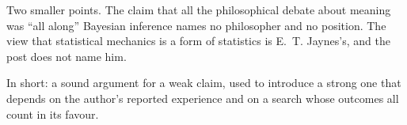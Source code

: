 \begin{afterword}
Two smaller points. The claim that all the philosophical debate about meaning was ``all along'' Bayesian inference names no philosopher and no position. The view that statistical mechanics is a form of statistics is E.~T. Jaynes's, and the post does not name him.

In short: a sound argument for a weak claim, used to introduce a strong one that depends on the author's reported experience and on a search whose outcomes all count in its favour.
\end{afterword}
